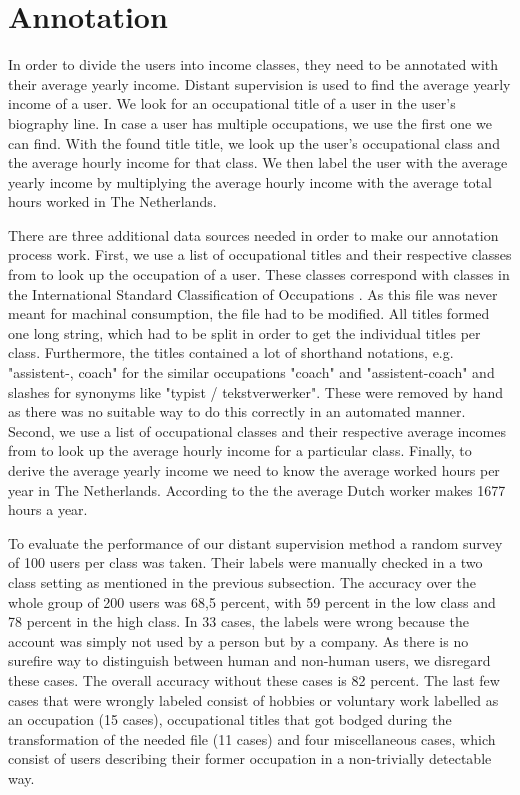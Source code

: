 \documentclass[
10pt, %
a4paper, %
oneside, %
headinclude,footinclude, %
] {book}%
\begin{document}
\section{Annotation}
In order to divide the users into income classes, they need to be annotated with their average yearly income. Distant supervision is used to find the average yearly income of a user. We look for an occupational title of a user in the user's biography line. In case a user has multiple occupations, we use the first one we can find. With the found title title, we look up the user's occupational class and the average hourly income for that class. We then label the user with the average yearly income by multiplying the average hourly income with the average total hours worked in The Netherlands. 

There are three additional data sources needed in order to make our annotation process work. First, we use a list of occupational titles and their respective classes from \citet{codelijsten} to look up the occupation of a user. These classes correspond with classes in the International Standard Classification of Occupations \citep{isco}. As this file was never meant for machinal consumption, the file had to be modified. All titles formed one long string, which had to be split in order to get the individual titles per class. Furthermore, the titles contained a lot of shorthand notations, e.g. "assistent-, coach" for the similar occupations "coach" and "assistent-coach" and slashes for synonyms like "typist / tekstverwerker". These were removed by hand as there was no suitable way to do this correctly in an automated manner. Second, we use a list of occupational classes and their respective average incomes from \citet{uurlonen} to look up the average hourly income for a particular class. Finally, to derive the average yearly income we need to know the average worked hours per year in The Netherlands. According to the \citet{hours} the average Dutch worker makes 1677 hours a year.

To evaluate the performance of our distant supervision method a random survey of 100 users per class was taken. Their labels were manually checked in a two class setting as mentioned in the previous subsection. The accuracy over the whole group of 200 users was 68,5 percent, with 59 percent in the low class and 78 percent in the high class. In 33 cases, the labels were wrong because the account was simply not used by a person but by a company. As there is no surefire way to distinguish between human and non-human users, we disregard these cases. The overall accuracy without these cases is 82 percent. The last few cases that were wrongly labeled consist of hobbies or voluntary work labelled as an occupation (15 cases), occupational titles that got bodged during the transformation of the needed file (11 cases) and four miscellaneous cases, which consist of users describing their former occupation in a non-trivially detectable way.
\end{document}
